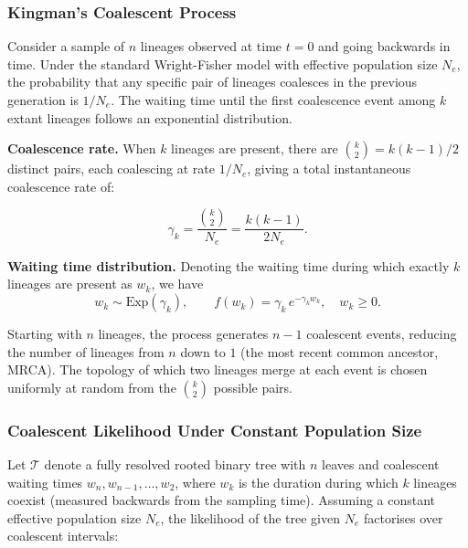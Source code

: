 \documentclass[11pt, a4paper]{article}
\begin{document}
\subsubsection{Kingman's Coalescent Process}

Consider a sample of $n$ lineages observed at time $t = 0$ and going backwards in time. Under the standard Wright-Fisher model with effective population size $N_e$, the probability that any specific pair of lineages coalesces in the previous generation
is $1/N_e$. The waiting time until the first coalescence event among $k$ extant lineages follows an
exponential distribution.

\medskip
\noindent\textbf{Coalescence rate.}
When $k$ lineages are present, there are $\binom{k}{2} = k(k-1)/2$ distinct pairs,
each coalescing at rate $1/N_e$, giving a total instantaneous coalescence rate of: 

\begin{equation}
    \gamma_k = \frac{\binom{k}{2}}{N_e} = \frac{k(k-1)}{2N_e}.
    \label{eq:coalrate}
\end{equation}

\noindent\textbf{Waiting time distribution.}
Denoting the waiting time during which exactly $k$ lineages are present as $w_k$,
we have
\begin{equation}
    w_k \sim \mathrm{Exp}\!\left(\gamma_k\right),
    \qquad
    f(w_k) = \gamma_k\, e^{-\gamma_k w_k},
    \quad w_k \geq 0.
    \label{eq:waitingtime}
\end{equation}

Starting with $n$ lineages, the process generates $n - 1$ coalescent events, reducing
the number of lineages from $n$ down to $1$ (the most recent common ancestor, MRCA).
The topology of which two lineages merge at each event is chosen uniformly at random
from the $\binom{k}{2}$ possible pairs.

\subsubsection{Coalescent Likelihood Under Constant Population Size}

Let $\mathcal{T}$ denote a fully resolved rooted binary tree with $n$ leaves and
coalescent waiting times $w_n, w_{n-1}, \ldots, w_2$, where $w_k$ is the duration
during which $k$ lineages coexist (measured backwards from the sampling time).
Assuming a constant effective population size $N_e$, the likelihood of the tree
given $N_e$ factorises over coalescent intervals:
\end{document}
